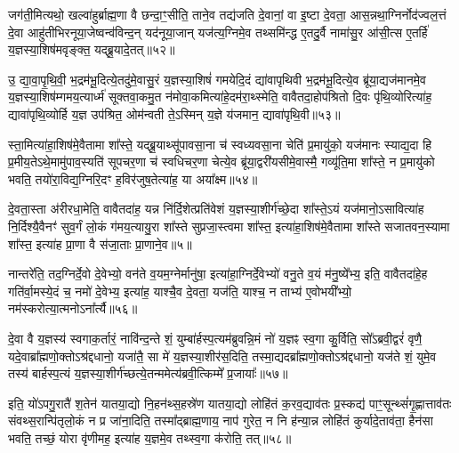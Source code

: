 जग॑ती॒मित्यथो॒ खल्वा॑हुर्ब्राह्म॒णा वै छन्दा॒ꣳ॒सीति॒ ताने॒व तद्य॑जति दे॒वानां॒ वा इ॒ष्टा दे॒वता॒ आस॒न्नथा॒ग्निर्नोद॑ज्वल॒त्तं दे॒वा आहु॑तीभिरनूया॒जेष्वन्व॑विन्द॒न् यद॑नूया॒जान् यज॑त्य॒ग्निमे॒व तथ्समि॑न्द्ध ए॒तदु॒र्वै नामा॑सु॒र आ॑सी॒त्स ए॒तर्\mbox{}हि॑ य॒ज्ञस्या॒शिष॑मवृङ्क्त॒ यद्ब्रू॒यादे॒तत्॥५२॥

उ॒ द्या॒वा॒पृ॒थि॒वी॒ भ॒द्रम॑भू॒दित्ये॒तदु॑मे॒वासु॒रं य॒ज्ञस्या॒शिषं॑ गमयेदि॒दं द्या॑वापृथिवी भ॒द्रम॑भू॒दित्ये॒व ब्रू॑या॒द्यज॑मानमे॒व य॒ज्ञस्या॒शिष॑म्गमय॒त्यार्ध्म॑ सूक्तवा॒कमु॒त न॑मोवा॒कमित्या॑हे॒दम॑रा॒थ्स्मेति॒ वावैतदा॒होप॑श्रितो दि॒वः पृ॑थि॒व्योरित्या॑ह॒ द्यावा॑पृथि॒व्योर्\mbox{}हि य॒ज्ञ उप॑श्रित॒ ओम॑न्वती ते॒\-ऽस्मिन् य॒ज्ञे य॑जमान॒ द्यावा॑पृथि॒वी॥५३॥

स्ता॒मित्या॑हा॒शिष॑मे॒वैतामा शा᳚स्ते॒ यद्ब्रू॒याथ्सू॑पावसा॒ना च॑ स्वध्यवसा॒ना चेति॑ प्र॒मायु॑को॒ यज॑मानः स्याद्य॒दा हि प्र॒मीय॒ते\-ऽथे॒मामु॑पाव॒स्यति॑ सूपचर॒णा च॑ स्वधिचर॒णा चेत्ये॒व ब्रू॑या॒द्वरी॑यसीमे॒वास्मै॒ गव्यू॑ति॒मा शा᳚स्ते॒ न प्र॒मायु॑को भवति॒ तयो॑रा॒विद्य॒ग्निरि॒दꣳ ह॒विर॑जुष॒तेत्या॑ह॒ या अया᳚क्ष्म॥५४॥

दे॒वता॒स्ता अ॑रीरधा॒मेति॒ वावैतदा॑ह॒ यन्न नि॑र्दि॒शेत्प्रति॑वेशं य॒ज्ञस्या॒शीर्ग॑च्छे॒दा शा᳚स्ते॒\-ऽयं यज॑मानो॒\-ऽसावित्या॑ह नि॒र्दिश्यै॒वैनꣳ॑ सुव॒र्गं लो॒कं ग॑मय॒त्यायु॒रा शा᳚स्ते सुप्रजा॒स्त्वमा शा᳚स्त॒ इत्या॑हा॒शिष॑मे॒वैतामा शा᳚स्ते सजातवन॒स्यामा शा᳚स्त॒ इत्या॑ह प्रा॒णा वै स॑जा॒ताः प्रा॒णाने॒व॥५॥

नान्तरे॑ति॒ तद॒ग्निर्दे॒वो दे॒वेभ्यो॒ वन॑ते व॒यम॒ग्नेर्मानु॑षा॒ इत्या॑हा॒ग्निर्दे॒वेभ्यो॑ वनु॒ते व॒यं म॑नु॒ष्ये᳚भ्य॒ इति॒ वावैतदा॑हे॒ह गति॑र्वा॒मस्ये॒दं च॒ नमो॑ दे॒वेभ्य॒ इत्या॑ह॒ याश्चै॒व दे॒वता॒ यज॑ति॒ याश्च॒ न ताभ्य॑ ए॒वोभयी᳚भ्यो॒ नम॑स्करोत्या॒त्मनो\-ऽना᳚र्त्यै॥५६॥

{\anuvakamend[{श्रि॒तस्ते॒ प्र त्रि॒ष्टुभ॑मे॒तद्द्यावा॑पृथि॒वी या अया᳚क्ष्म प्रा॒णाने॒व षट्च॑त्वारिꣳशच्च॥९॥}]}

दे॒वा वै य॒ज्ञस्य॑ स्वगाक॒र्तारं॒ नावि॑न्द॒न्ते शं॒ युम्बा॑र्\mbox{}हस्प॒त्यम॑ब्रुवन्नि॒मं नो॑ य॒ज्ञꣴ स्व॒गा कु॒र्विति॒ सो᳚\-ऽब्रवी॒द्वरं॑ वृणै॒ यदे॒वाब्रा᳚ह्मणो॒क्तो\-ऽश्र॑द्दधानो॒ यजा॑तै॒ सा मे॑ य॒ज्ञस्या॒शीर॑स॒दिति॒ तस्मा॒द्यदब्रा᳚ह्मणो॒क्तो\-ऽश्र॑द्दधानो॒ यज॑ते शं॒ युमे॒व तस्य॑ बार्\mbox{}हस्प॒त्यं य॒ज्ञस्या॒शीर्ग॑च्छत्ये॒तन्ममेत्य॑ब्रवी॒त्किम्मे᳚ प्र॒जायाः᳚॥५७॥

इति॒ यो॑\-ऽपगु॒रातै॑ श॒तेन॑ यातया॒द्यो नि॒हन॑थ्स॒हस्रे॑ण यातया॒द्यो लोहि॑तं क॒रव॒द्याव॑तः प्र॒स्कद्य॑ पाꣳ॒सून्थ्सं॑गृ॒ह्णात्ताव॑तः संवथ्स॒रान्पि॑तृलो॒कं न प्र जा॑ना॒दिति॒ तस्मा᳚द्ब्राह्म॒णाय॒ नाप॑ गुरेत॒ न नि ह॑न्या॒न्न लोहि॑तं कुर्यादे॒ताव॑ता॒ हैन॑सा भवति॒ तच्छं॒ योरा वृ॑णीमह॒ इत्या॑ह य॒ज्ञमे॒व तथ्स्व॒गा क॑रोति॒ तत्॥५८॥

